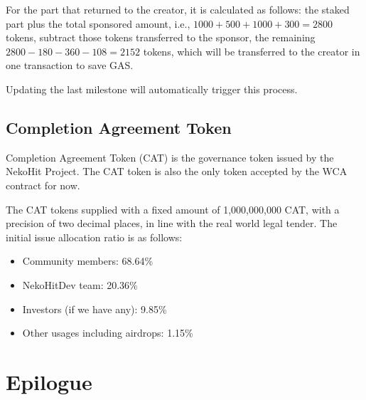 \documentclass[12pt,a4paper]{article}
\begin{document}
    For the part that returned to the creator, it is calculated as follows: the
    staked part plus the total sponsored amount, i.e.,
    $1000 + 500 + 1000 + 300 = 2800$ tokens, subtract those tokens transferred
    to the sponsor, the remaining $2800 - 180 - 360 - 108 = 2152$ tokens, which
    will be transferred to the creator in one transaction to save GAS.

    Updating the last milestone will automatically trigger this process.

    \subsection{Completion Agreement Token}\label{subsec:cat}

    Completion Agreement Token (CAT) is the governance token issued by the NekoHit
    Project.
    The CAT token is also the only token accepted by the WCA contract for now.

    The CAT tokens supplied with a fixed amount of 1,000,000,000 CAT, with a
    precision of two decimal places, in line with the real world legal tender.
    The initial issue allocation ratio is as follows:

    \begin{itemize}
        \item Community members: 68.64\%
        \item NekoHitDev team: 20.36\%
        \item Investors (if we have any): 9.85\%
        \item Other usages including airdrops: 1.15\%
    \end{itemize}


    \section{Epilogue}\label{sec:end}
\end{document}
